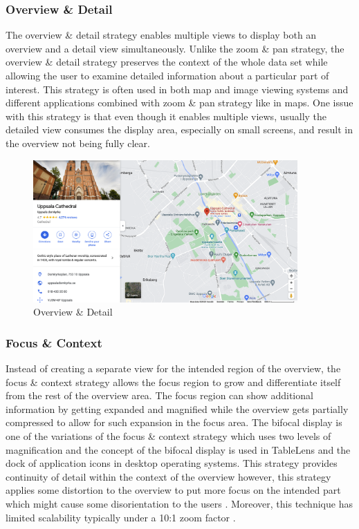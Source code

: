 \subsubsection{Overview \& Detail}

The overview \& detail strategy enables multiple views to display both an overview and a detail view simultaneously. Unlike the zoom \& pan strategy, the overview \& detail strategy preserves the context of the whole data set while allowing the user to examine detailed information about a particular part of interest. This strategy is often used in both map and image viewing systems \cite{plaisant1995image} and different applications combined with zoom \& pan strategy like in maps. One issue with this strategy is that even though it enables multiple views, usually the detailed view consumes the display area, especially on small screens, and result in the overview not being fully clear.

\begin{figure}[H]
\centering
\captionsetup{justification=centering}
\includegraphics[width=0.9\textwidth]{./pics/over}
\caption{Overview \& Detail \cite{googlemap}}
\label{fig:overviewANDdetail}
\end{figure}

\subsubsection{Focus \& Context}

Instead of creating a separate view for the intended region of the overview, the focus \& context strategy allows the focus region to grow and differentiate itself from the rest of the overview area. The focus region can show additional information by getting expanded and magnified while the overview gets partially compressed to allow for such expansion in the focus area. The bifocal display is one of the variations of the focus \& context strategy which uses two levels of magnification and the concept of the bifocal display is used in TableLens \cite{rao1994table} and the dock of application icons in desktop operating systems. This strategy provides continuity of detail within the context of the overview however, this strategy applies some distortion to the overview to put more focus on the intended part which might cause some disorientation to the users \cite{baudisch2002keeping}. Moreover, this technique has limited scalability typically under a 10:1 zoom factor \cite{salvendy2012handbook}.

